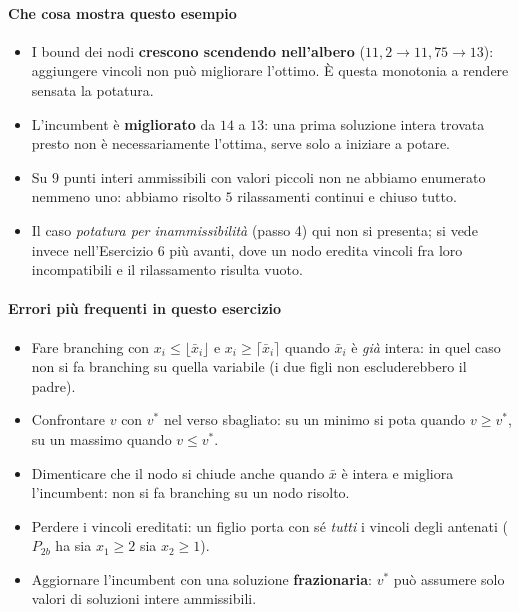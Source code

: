 \documentclass[12pt]{extarticle} %
\begin{document}
\paragraph{Che cosa mostra questo esempio}
\begin{itemize}
    \item I bound dei nodi \textbf{crescono scendendo nell'albero} ($11{,}2 \to 11{,}75 \to 13$): aggiungere vincoli non può migliorare l'ottimo. È questa monotonia a rendere sensata la potatura.
    \item L'incumbent è \textbf{migliorato} da $14$ a $13$: una prima soluzione intera trovata presto non è necessariamente l'ottima, serve solo a iniziare a potare.
    \item Su $9$ punti interi ammissibili con valori piccoli non ne abbiamo enumerato nemmeno uno: abbiamo risolto $5$ rilassamenti continui e chiuso tutto.
    \item Il caso \emph{potatura per inammissibilità} (passo 4) qui non si presenta; si vede invece nell'Esercizio 6 più avanti, dove un nodo eredita vincoli fra loro incompatibili e il rilassamento risulta vuoto.
\end{itemize}

\paragraph{Errori più frequenti in questo esercizio}
\begin{itemize}
    \item Fare branching con $x_i \le \lfloor \bar{x}_i \rfloor$ e $x_i \ge \lceil \bar{x}_i \rceil$ quando $\bar{x}_i$ è \emph{già} intera: in quel caso non si fa branching su quella variabile (i due figli non escluderebbero il padre).
    \item Confrontare $v$ con $v^*$ nel verso sbagliato: su un minimo si pota quando $v \ge v^*$, su un massimo quando $v \le v^*$.
    \item Dimenticare che il nodo si chiude anche quando $\bar{x}$ è intera e migliora l'incumbent: non si fa branching su un nodo risolto.
    \item Perdere i vincoli ereditati: un figlio porta con sé \emph{tutti} i vincoli degli antenati ($P_{2b}$ ha sia $x_1 \ge 2$ sia $x_2 \ge 1$).
    \item Aggiornare l'incumbent con una soluzione \textbf{frazionaria}: $v^*$ può assumere solo valori di soluzioni intere ammissibili.
\end{itemize}
\end{document}
